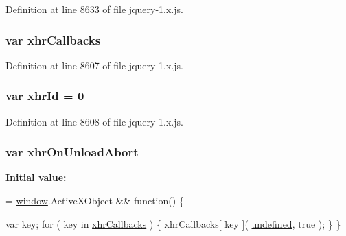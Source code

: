 Definition at line 8633 of file jquery-\/1.\+x.\+js.

\subsubsection[{\texorpdfstring{xhr\+Callbacks}{xhrCallbacks}}]{\setlength{\rightskip}{0pt plus 5cm}var xhr\+Callbacks}\hypertarget{jquery-1_8x_8js_a068f27a70831ff3a9e0ffa79e063847f}{}\label{jquery-1_8x_8js_a068f27a70831ff3a9e0ffa79e063847f}


Definition at line 8607 of file jquery-\/1.\+x.\+js.

\subsubsection[{\texorpdfstring{xhr\+Id}{xhrId}}]{\setlength{\rightskip}{0pt plus 5cm}var xhr\+Id = 0}\hypertarget{jquery-1_8x_8js_aa23ed64cf7afc9b028419517bf23fcea}{}\label{jquery-1_8x_8js_aa23ed64cf7afc9b028419517bf23fcea}


Definition at line 8608 of file jquery-\/1.\+x.\+js.

\subsubsection[{\texorpdfstring{xhr\+On\+Unload\+Abort}{xhrOnUnloadAbort}}]{\setlength{\rightskip}{0pt plus 5cm}var xhr\+On\+Unload\+Abort}\hypertarget{jquery-1_8x_8js_a271c099ab18ab35c15cac2faa2a097aa}{}\label{jquery-1_8x_8js_a271c099ab18ab35c15cac2faa2a097aa}
{\bfseries Initial value\+:}
\begin{DoxyCode}
= \hyperlink{jquery-1_8x_8js_ad55530ae1e5978df8e721017c1fc8466}{window}.ActiveXObject && \textcolor{keyword}{function}() \{
        
        var key;
        \textcolor{keywordflow}{for} ( key in \hyperlink{jquery-1_8x_8js_a068f27a70831ff3a9e0ffa79e063847f}{xhrCallbacks} ) \{
            xhrCallbacks[ key ]( \hyperlink{jquery-1_8x_8js_a08113a236cc18d2a9d5ce27e638012be}{undefined}, true );
        \}
    \}
\end{DoxyCode}


